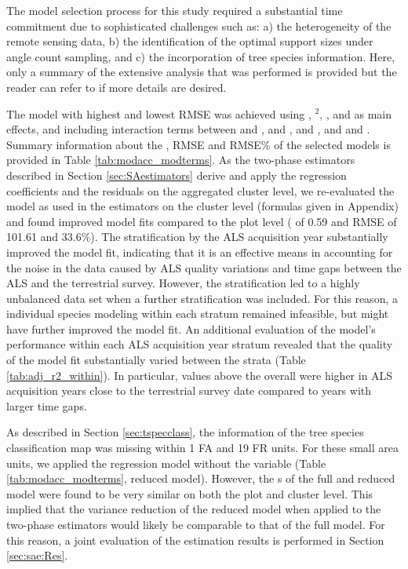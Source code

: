 The model selection process for this study required a substantial time commitment due to sophisticated challenges such as: a) the heterogeneity of the remote sensing data, b) the identification of the optimal support sizes under angle count sampling, and c) the incorporation of tree species information. Here, only a summary of the extensive analysis that was performed is provided but the reader can refer to \citet{hill2017a} if more details are desired.\par
The model with highest \adjrsq{} and lowest RMSE was achieved using \meanheight{}, \meanheight{}$^2$, \stddev{}, \alsyear{} and \treespecies{} as main effects, and including interaction terms between \meanheight{} and \alsyear{}, \stddev{} and \alsyear{}, \meanheight{} and \stddev{}, and \meanheight{} and \treespecies{}. Summary information about the \adjrsq{}, RMSE and RMSE\% of the selected models is provided in Table \ref{tab:modacc_modterms}. As the two-phase estimators described in Section \ref{sec:SAestimators} derive and apply the regression coefficients and the residuals on the aggregated cluster level, we re-evaluated the model as used in the estimators on the cluster level (formulas given in Appendix) and found improved model fits compared to the plot level (\adjrsq{} of 0.59 and RMSE of 101.61 \mha{} and 33.6\%). The stratification by the ALS acquisition year substantially improved the model fit, indicating that it is an effective means in accounting for the noise in the data caused by ALS quality variations and time gaps between the ALS and the terrestrial survey. However, the stratification led to a highly unbalanced data set when a further \treespecies{} stratification was included. For this reason, a individual species modeling within each \alsyear{} stratum remained infeasible, but might have further improved the model fit. An additional evaluation of the model's performance within each ALS acquisition year stratum revealed that the quality of the model fit substantially varied between the strata (Table \ref{tab:adj_r2_within}). In particular, values above the overall \adjrsq{} were higher in ALS acquisition years close to the terrestrial survey date compared to years with larger time gaps.\par
As described in Section \ref{sec:tspecclass}, the information of the tree species classification map was missing within 1 FA and 19 FR units. For these small area units, we applied the regression model without the \treespecies{} variable (Table \ref{tab:modacc_modterms}, reduced model). However, the \adjrsq{}s of the full and reduced model were found to be very similar on both the plot and cluster level. This implied that the variance reduction of the reduced model when applied to the two-phase estimators would likely be comparable to that of the full model. For this reason, a joint evaluation of the estimation results is performed in Section \ref{sec:sae:Res}.

